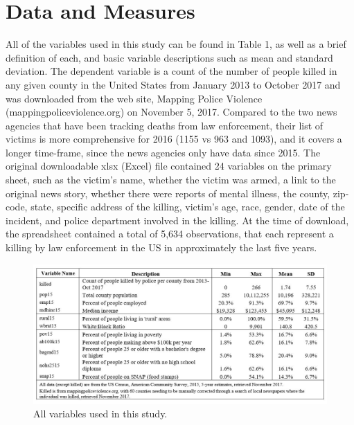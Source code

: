 \documentclass[sigconf]{acmart}
\begin{document}
\section{Data and Measures}

All of the variables used in this study can be found in Table 1, as well as a brief definition of each, and basic variable descriptions such as mean and standard deviation.  The dependent variable is a count of the number of people killed in any given county in the United States from January 2013 to October 2017 and was downloaded from the web site, Mapping Police Violence (mappingpoliceviolence.org) on November 5, 2017.  Compared to the two news agencies that have been tracking deaths from law enforcement, their list of victims is more comprehensive for 2016 (1155 vs 963 and 1093), and it covers a longer time-frame, since the news agencies only have data since 2015.  The original downloadable xlsx (Excel) file contained 24 variables on the primary sheet, such as the victim's name, whether the victim was armed, a link to the original news story, whether there were reports of mental illness, the county, zip-code, state, specific address of the killing, victim's age, race, gender, date of the incident, and police department involved in the killing. At the time of download, the spreadsheet contained a total of 5,634 observations, that each represent a killing by law enforcement in the US in approximately the last five years.

\begin{figure}
\includegraphics[width=1.0\textwidth]{images/table1.jpg}
\caption{All variables used in this study.}
\end{figure}
\end{document}
